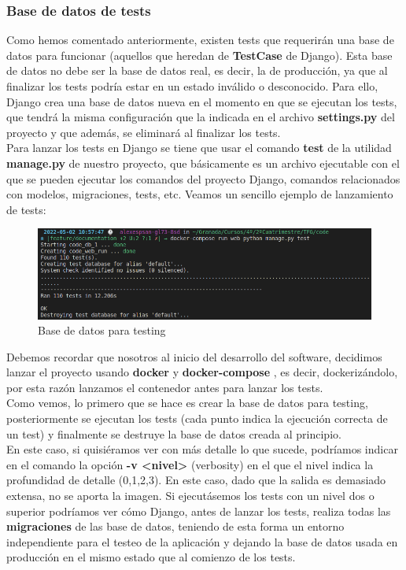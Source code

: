 \subsubsection{Base de datos de tests}
Como hemos comentado anteriormente, existen tests que requerirán una base de datos para
funcionar (aquellos que heredan de \textbf{TestCase} de Django). Esta base de datos no debe
ser la base de datos real, es decir, la de producción, ya que al finalizar los tests podría
estar en un estado inválido o desconocido. Para ello, Django crea una base de datos nueva
en el momento en que se ejecutan los tests, que tendrá la misma configuración que la
indicada en el archivo \textbf{settings.py} del proyecto y que además, se eliminará al
finalizar los tests.\\

Para lanzar los tests en Django se tiene que usar el comando \textbf{test} de la utilidad
\textbf{manage.py} de nuestro proyecto, que básicamente es un archivo ejecutable con el
que se pueden ejecutar los comandos del proyecto Django, comandos relacionados con modelos,
migraciones, tests, etc. Veamos un sencillo ejemplo de lanzamiento de tests:

    \begin{figure}[H]
        \centering
        \includegraphics[scale=0.40]{imagenes/db-test.png}
        \caption{Base de datos para testing}
        \label{fig:db-test}
    \end{figure}

Debemos recordar que nosotros al inicio del desarrollo del software, decidimos lanzar el
proyecto usando \textbf{docker} \cite{docker} y \textbf{docker-compose} \cite{docker-compose},
es decir, dockerizándolo, por esta razón lanzamos el contenedor antes para lanzar los
tests.\\

Como vemos, lo primero que se hace es crear la base de datos para testing, posteriormente
se ejecutan los tests (cada punto indica la ejecución correcta de un test) y finalmente se
destruye la base de datos creada al principio.\\

En este caso, si quisiéramos ver con más detalle lo que sucede, podríamos indicar en el
comando la opción \textbf{-v <nivel>} (verbosity) en el que el nivel indica la profundidad
de detalle (0,1,2,3). En este caso, dado que la salida es demasiado extensa, no se aporta
la imagen. Si ejecutásemos los tests con un nivel dos o superior podríamos ver cómo Django,
antes de lanzar los tests, realiza todas las \textbf{migraciones} de las base de datos,
teniendo de esta forma un entorno independiente para el testeo de la aplicación y dejando
la base de datos usada en producción en el mismo estado que al comienzo de los tests.\\

